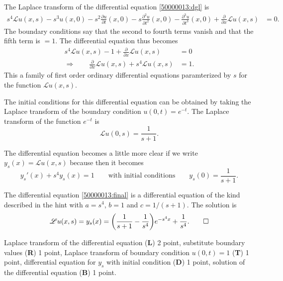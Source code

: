 \begin{loesung}
\begin{teilaufgaben}
\item
The Laplace transform of the differential equation
\eqref{50000013:dgl}
is
\begin{align*}
s^4 \mathscr{L}u(x,s)
-s^3 u(x,0)
-s^2\frac{\partial u}{\partial t}(x,0)
-s\frac{\partial^2 u}{\partial t^2}(x,0)
-\frac{\partial^3 u}{\partial t^3}(x,0)
+
\frac{\partial}{\partial x}\mathscr{L}u(x,s)
&=
0.
\end{align*}
The boundary conditions say that the second to fourth terms vanish
and that the fifth term is $=1$.
The differential equation thus becomes
\begin{align*}
s^4 \mathscr{L}u(x,s)
-1
+
\frac{\partial}{\partial x}\mathscr{L}u(x,s)
&=
0
\\
\Rightarrow\qquad
\frac{\partial}{\partial x}\mathscr{L}u(x,s)
+
s^4 \mathscr{L}u(x,s)
&=
1.
\end{align*}
This a family of first order ordinary differential equations
paramterized by $s$ for the function $\mathscr{L}u(x,s)$.

The initial conditions for this differential equation can be obtained
by taking the Laplace transform of the boundary condition
$u(0,t)=e^{-t}$.
The Laplace transform of the function $e^{-t}$ is
\[
\mathscr{L}u(0,s) = \frac1{s+1}.
\]

The differential equation becomes a little more clear if we write
$y_s(x) = \mathscr{L}u(x,s)$ because then it becomes
\begin{equation}
y_s'(x) + s^4 y_s(x)=1
\qquad\text{with initial conditions}\qquad
y_s(0)=\frac1{s+1}.
\label{50000013:final}
\end{equation}

\item
The differential equation \eqref{50000013:final} is a differential equation
of the kind described in the hint with $a=s^4$, $b=1$ and $c=1/(s+1)$.
The solution is
\[
\mathscr{L}u(x,s)
=
y_s(x)
=
\biggl(\frac1{s+1}-\frac1{s^4}\biggr)e^{-s^4x} + \frac{1}{s^4}.
\qedhere
\]
\end{teilaufgaben}
\end{loesung}

\begin{bewertung}
Laplace transform  of the differential equation ({\bf L}) 2 point,
substitute boundary values ({\bf R}) 1 point,
Laplace transform of boundary condition $u(0,t)=1$ ({\bf T}) 1 point,
differential equation for $y_s$ with initial condition ({\bf D}) 1 point,
solution of the differential equation ({\bf B}) 1 point.
\end{bewertung}
